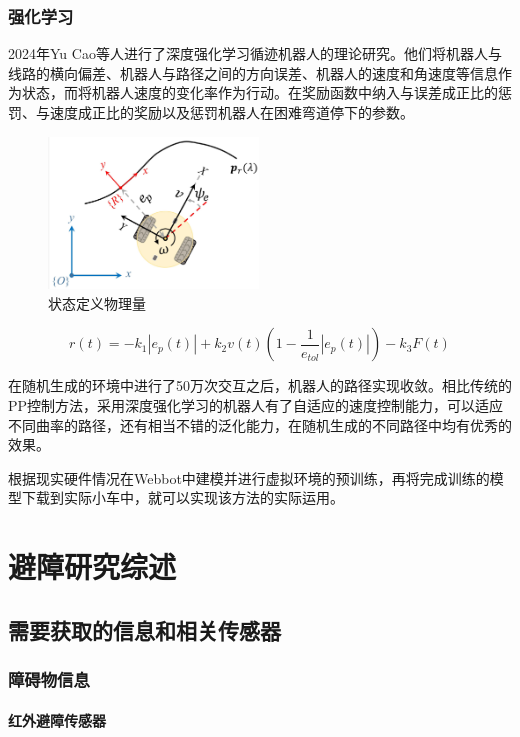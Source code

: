 \documentclass{report}
\begin{document}
\subsubsection{强化学习}
\label{subsec:label}
2024年Yu Cao等人进行了深度强化学习循迹机器人的理论研究\cite{cao2024path}。他们将机器人与线路的横向偏差、机器人与路径之间的方向误差、机器人的速度和角速度等信息作为状态，而将机器人速度的变化率作为行动。在奖励函数中纳入与误差成正比的惩罚、与速度成正比的奖励以及惩罚机器人在困难弯道停下的参数。

\begin{figure}[ht]
  \centering
  \includegraphics[width=0.5\textwidth]{figures/state.png}
  \caption{状态定义物理量\cite{cao2024path}}
\end{figure}

\[ r\left(t\right)=-k_{1}\left|e_{p}\left(t\right)\right|+k_{2}v\left(t\right)\left(1-\frac{1}{e_{tol}}\left|e_{p}\left(t\right)\right|\right)-k_{3}F\left(t\right) \]

在随机生成的环境中进行了50万次交互之后，机器人的路径实现收敛。相比传统的PP控制方法，采用深度强化学习的机器人有了自适应的速度控制能力，可以适应不同曲率的路径，还有相当不错的泛化能力，在随机生成的不同路径中均有优秀的效果。

根据现实硬件情况在Webbot中建模并进行虚拟环境的预训练，再将完成训练的模型下载到实际小车中，就可以实现该方法的实际运用。
\section{避障研究综述}
\label{sec:label}
\subsection{需要获取的信息和相关传感器}
\label{subsec:label}
\subsubsection{障碍物信息}
\label{subsec:label}
\paragraph{红外避障传感器}
\end{document}
